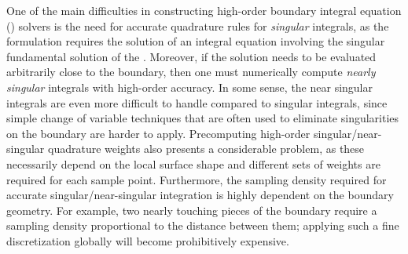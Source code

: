 One of the main difficulties in constructing high-order boundary integral equation (\bie) solvers is the need for accurate quadrature rules for \emph{singular} integrals, as
the formulation requires the solution of an integral equation involving the singular fundamental solution of the \pde.
Moreover, if the solution needs to be evaluated arbitrarily close to the boundary, then one must numerically compute \emph{nearly singular} integrals with high-order accuracy.
In some sense, the near singular integrals are even more difficult to handle compared to singular integrals, since simple change of variable techniques that are often used to eliminate singularities on the boundary are harder to apply. 
Precomputing high-order singular/near-singular quadrature weights also presents a considerable problem, as these necessarily depend on the local surface shape and different sets of weights are required for each sample point.
Furthermore, the sampling density required for accurate singular/near-singular integration is highly dependent on the boundary geometry.
For example, two nearly touching pieces of the boundary require a sampling density proportional to the distance between them; applying such a fine discretization globally will become prohibitively expensive.

%

